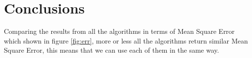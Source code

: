 \documentclass[a4paper,12pt,oneside,titlepage]{article}
\begin{document}
	\section{Conclusions}
	 Comparing the results from all the algorithms in terms of Mean Square Error which shown in figure \ref{fig:err}, more or less all the algorithms return similar Mean Square Error, this means that we can use each of them in the same way.
	 \begin{figure}[H]
	 	\centering
	 	\begin{center}
	 		\\

\end{center}
\end{figure}
\end{document}
